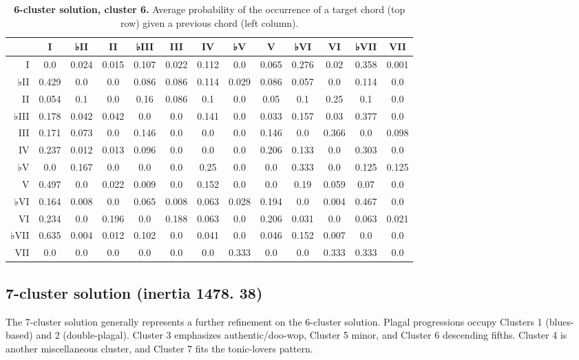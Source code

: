\begin{table}[htbp]
\begin{minipage}{\linewidth}
\setlength{\tymax}{0.5\linewidth}
\centering
\small
\caption{\textbf{6-cluster solution, cluster 6.} Average probability of the occurrence of a target chord (top row) given a previous chord (left column).}
\label{6-clustersolutioncluster6.averageprobabilityoftheoccurrenceofatargetchordtoprowgivenapreviouschordleftcolumn.}
\begin{tabulary}{\textwidth}{@{}RCCCCCCCCCCCC@{}} \toprule
&I&♭II&II&♭III&III&IV&♭V&V&♭VI&VI&♭VII&VII\\
\midrule
I&0.0&0.024&0.015&0.107&0.022&0.112&0.0&0.065&0.276&0.02&0.358&0.001\\
♭II&0.429&0.0&0.0&0.086&0.086&0.114&0.029&0.086&0.057&0.0&0.114&0.0\\
II&0.054&0.1&0.0&0.16&0.086&0.1&0.0&0.05&0.1&0.25&0.1&0.0\\
♭III&0.178&0.042&0.042&0.0&0.0&0.141&0.0&0.033&0.157&0.03&0.377&0.0\\
III&0.171&0.073&0.0&0.146&0.0&0.0&0.0&0.146&0.0&0.366&0.0&0.098\\
IV&0.237&0.012&0.013&0.096&0.0&0.0&0.0&0.206&0.133&0.0&0.303&0.0\\
♭V&0.0&0.167&0.0&0.0&0.0&0.25&0.0&0.0&0.333&0.0&0.125&0.125\\
V&0.497&0.0&0.022&0.009&0.0&0.152&0.0&0.0&0.19&0.059&0.07&0.0\\
♭VI&0.164&0.008&0.0&0.065&0.008&0.063&0.028&0.194&0.0&0.004&0.467&0.0\\
VI&0.234&0.0&0.196&0.0&0.188&0.063&0.0&0.206&0.031&0.0&0.063&0.021\\
♭VII&0.635&0.004&0.012&0.102&0.0&0.041&0.0&0.046&0.152&0.007&0.0&0.0\\
VII&0.0&0.0&0.0&0.0&0.0&0.0&0.333&0.0&0.0&0.333&0.333&0.0\\

\bottomrule

\end{tabulary}
\end{minipage}
\end{table}

\subsection{7-cluster solution (inertia 1478. 38)}
\label{7-clustersolutioninertia1478.38}

The 7-cluster solution generally represents a further refinement on the 6-cluster solution. Plagal progressions occupy Clusters 1 (blues-based) and 2 (double-plagal). Cluster 3 emphasizes authentic\slash doo-wop, Cluster 5 minor, and Cluster 6 descending fifths. Cluster 4 is another miscellaneous cluster, and Cluster 7 fits the tonic-lovers pattern.

